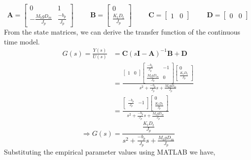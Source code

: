 \documentclass[11pt]{article}
\begin{document}
\[ 
\mathbf{A} = \begin{bmatrix}
    0 & 1\\
    - \frac{M_b g D_m}{J_p} & \frac{-b_p}{J_p}
\end{bmatrix} \hspace{1cm}
\mathbf{B} = \begin{bmatrix}
    0\\
    \frac{K_t D_t}{J_p}
\end{bmatrix} \hspace{1cm}
\mathbf{C} = \begin{bmatrix}
    1 & 0
\end{bmatrix} \hspace{1cm}
\mathbf{D} = \begin{bmatrix}
    0 & 0
\end{bmatrix}
\]
From the state matrices, we can derive the transfer function of the continuous time model.
\begin{align*}
    G(s) = \frac{Y(s)}{U(s)} &= \mathbf{C}(s\mathbf{I} - \mathbf{A})^{-1}\mathbf{B} + \mathbf{D}\\
    &= \frac{\begin{bmatrix}
    1 & 0
\end{bmatrix} \begin{bmatrix}
    \frac{-b_p}{J_p} & - 1\\
    \frac{M_b g D_m}{J_p} & 0
\end{bmatrix} \begin{bmatrix}
    0\\
    \frac{K_t D_t}{J_p}
\end{bmatrix}}{s^2 + \frac{-b_p}{J_p}s + \frac{M_b g D_m}{J_p}}\\
&= \frac{\begin{bmatrix}
    \frac{-b_p}{J_p} & - 1
\end{bmatrix} \begin{bmatrix}
    0\\
    \frac{K_t D_t}{J_p}
\end{bmatrix}}{s^2 + \frac{-b_p}{J_p}s + \frac{M_b g D_m}{J_p}}\end{align*}
\begin{equation}\label{eq:TF}
\Rightarrow G(s) = 
    \frac{\frac{K_t D_t}{J_p}}{s^2 + \frac{-b_p}{J_p}s + \frac{M_b g D_m}{J_p}}
\end{equation}
Substituting the empirical parameter values using MATLAB we have,
\end{document}
